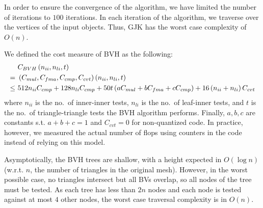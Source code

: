 \documentclass[twocolumn]{article}
\newcommand{\mypar}[1]{{\bf #1.}}
\begin{document}
In order to ensure the convergence of the algorithm, we have limited the number of iterations to $100$ iterations. 
In each iteration of the algorithm, we traverse over the vertices of the input objects. 
Thus, GJK has the worst case complexity of $O(n)$.

We defined the cost measure of BVH as the following: 
\begin{equation*}
\resizebox{\linewidth}{!}{$
\begin{split}
& \ C_{BVH}\left(n_{ii}, n_{li}, t\right) \\
= & \ \left(C_{mul}, C_{fma}, C_{cmp}, C_{cvt}\right)\left(n_{ii}, n_{li}, t\right) \\
\leq & \  512 n_{ii}C_{cmp} + 128 n_{li} C_{cmp} + 50t \left(a C_{mul} + b C_{fma} + c C_{cmp}\right) + 16\left(n_{ii} + n_{li}\right) C_{cvt} %
\end{split}
$}
\end{equation*}
where $n_{ii}$ is the no.~of inner-inner tests, $n_{li}$ is the no.~of leaf-inner tests, and $t$ is the no.~of triangle-triangle tests the BVH algorithm performs.
Finally, $a, b, c$ are constants s.t. $a + b + c = 1$ and $C_{cvt}=0$ for non-quantized code.
In practice, however, we measured the actual number of flops using counters in the code instead of relying on this model.

Asymptotically, the BVH trees are shallow, with a height expected in $O(\log n)$ (w.r.t. $n$, the number of triangles in the original mesh).
However, in the worst possible case, no triangles intersect but all BVs overlap, so all nodes of the tree must be tested. 
As each tree has less than $2n$ nodes and each node is tested against at most $4$ other nodes, the worst case traversal complexity is in $O(n)$.

%
%
%
%
%
\end{document}
